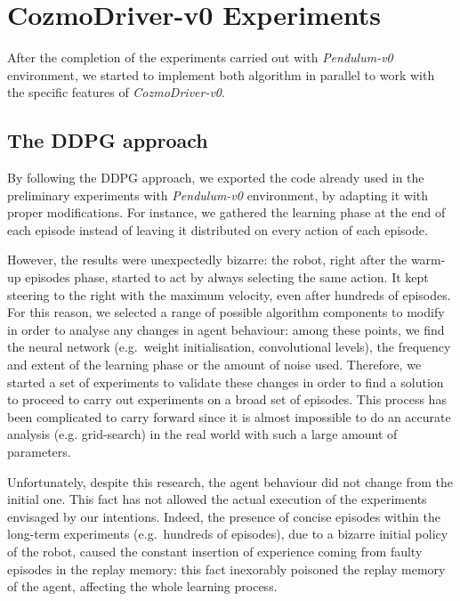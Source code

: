\FloatBarrier

\section{CozmoDriver-v0 Experiments} \label{sec:cozmo-exp}

After the completion of the experiments carried out with \textit{Pendulum-v0} environment, we started to implement both algorithm in parallel to work with the specific features of \textit{CozmoDriver-v0}.

\subsection{The DDPG approach}

By following the DDPG approach, we exported the code already used in the preliminary experiments with \textit{Pendulum-v0} environment, by adapting it with proper modifications.
For instance, we gathered the learning phase at the end of each episode instead of leaving it distributed on every action of each episode.

However, the results were unexpectedly bizarre: the robot, right after the warm-up episodes phase, started to act by always selecting the same action. It kept steering to the right with the maximum velocity, even after hundreds of episodes.
For this reason, we selected a range of possible algorithm components to modify in order to analyse any changes in agent behaviour: among these points, we find the neural network (e.g.\ weight initialisation, convolutional levels), the frequency and extent of the learning phase or the amount of noise used.
Therefore, we started a set of experiments to validate these changes in order to find a solution to proceed to carry out experiments on a broad set of episodes.
This process has been complicated to carry forward since it is almost impossible to do an accurate analysis (e.g. grid-search) in the real world with such a large amount of parameters.

Unfortunately, despite this research, the agent behaviour did not change from the initial one.
This fact has not allowed the actual execution of the experiments envisaged by our intentions.
Indeed, the presence of concise episodes within the long-term experiments (e.g.\ hundreds of episodes), due to a bizarre initial policy of the robot, caused the constant insertion of experience coming from faulty episodes in the replay memory: this fact inexorably poisoned the replay memory of the agent, affecting the whole learning process.

